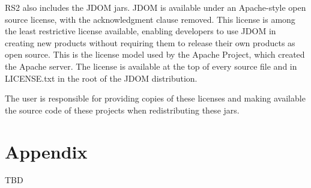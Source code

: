 \documentclass[10pt]{article}
\begin{document}
\bigbreak \noindent
RS2 also includes the JDOM jars.  JDOM is available under an Apache-style open
source license, with the acknowledgment clause removed. This license is among
the least restrictive license available, enabling developers to use JDOM in
creating new products without requiring them to release their own products as
open source. This is the license model used by the Apache Project, which created
the Apache server. The license is available at the top of every source file and
in LICENSE.txt in the root of the JDOM distribution.              

\bigbreak \noindent
The user is responsible for providing copies of these licenses and making
available the source code of these projects when redistributing these jars.

\section{Appendix}
TBD
\end{document}
